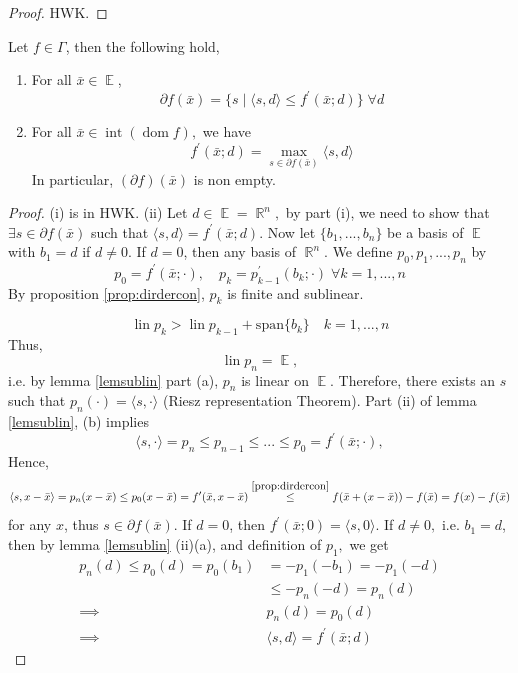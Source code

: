 \documentclass{tufte-handout}
\DeclareMathOperator{\dom}{dom}
\DeclareMathOperator{\R}{\mathbb{R}}
\DeclareMathOperator{\E}{\mathbb{E}}
\DeclareMathOperator{\lin}{lin}
\begin{document}
{{\begin{lemma}
\begin{enumerate}
  \end{enumerate}
  \begin{proof} 
    HWK.
  \end{proof}
\end{lemma}
\begin{theorem}
  Let $f \in \Gamma$, then the following hold, 
  \begin{enumerate}
    \item[\it (i)] For all $\bar x \in \E$, $$\partial f(\bar x) = \{ s \mid \langle s, d \rangle \leq f^\prime (\bar x ; d) \} \; \forall d$$
    \item[\it (ii)] For all $\bar x \in \operatorname{int} (\dom f),$ we have $$f^\prime (\bar x; d) = \max_{s\in \partial f(\bar x) } \langle s, d \rangle $$
    In particular, $(\partial f)(\bar x) $ is non empty. 
  \end{enumerate}
  \begin{proof} 
    (i) is in HWK. \newline 
    (ii) Let $d \in \E = \R^n ,$ by part (i), we need to show that $\exists s \in \partial f(\bar x )$ such that $\langle s, d \rangle = f^\prime (\bar x ; d)$. Now let $\{b_1,...,b_n\}$ be a basis of $\E$ with $b_1 = d$ if $d \neq 0$. If $d= 0$, then any basis of $\R^n$. We define $p_0, p_1, ..., p_n$ by
    $$p_0= f^\prime(\bar x; \cdot ),\quad p_k = p^\prime _{k -1}(b_k ; \cdot) \; \forall k= 1,...,n $$ 
    By proposition \ref{prop:dirdercon}, $p_k$ is finite and sublinear. 

    $$\lin p_k > \lin p_{k-1} + \text{span}\{b_k\}\quad k = 1,...,n $$
    Thus, 
    $$\lin p_n = \E, $$
    i.e. by lemma \ref{lemsublin} part (a), $p_n$ is linear on $\E$. Therefore, there exists an $s$ such that $p_n(\cdot {}) = \langle s, \cdot \rangle$ (Riesz representation Theorem). Part (ii) of lemma \ref{lemsublin}, (b) implies 
         $$ \langle s, \cdot \rangle = p_n \leq p_{n-1} \leq ... \leq p_0 = f^\prime (\bar x ; \cdot ),$$
          Hence, 
    $$\langle s, x -\bar x \rangle = p_n (x -\bar x) \leq p_0 (x -\bar x ) = f^\prime (\bar x , x - \bar x) \overset{\ref{prop:dirdercon}}{\leq} f(\bar x + (x - \bar x)) - f(\bar x ) = f(x) -f(\bar x) $$
    for any $x$, thus $s \in \partial f(\bar x)$. If $d = 0$, then $ f^\prime (\bar x; 0) = \langle s, 0 \rangle. $ If $d \neq 0,$ i.e. $b_1 = d$, then by lemma \ref{lemsublin} (ii)(a), and definition of $p_1,$ we get 
    \begin{equation*}
      \begin{split}
        p_n(d)\leq p_0 (d) = p_0(b_1) &= - p_1(-b_1) = -p_1(-d)\\ 
&\leq -p_n (-d) = p_n (d) \\ 
        \implies & p_n(d)= p_0 (d)\\ 
        \implies & \langle s, d\rangle = f^\prime (\bar x ; d )
      \end{split}
    \end{equation*}
    

\end{proof}
\end{theorem}}}
\end{document}
